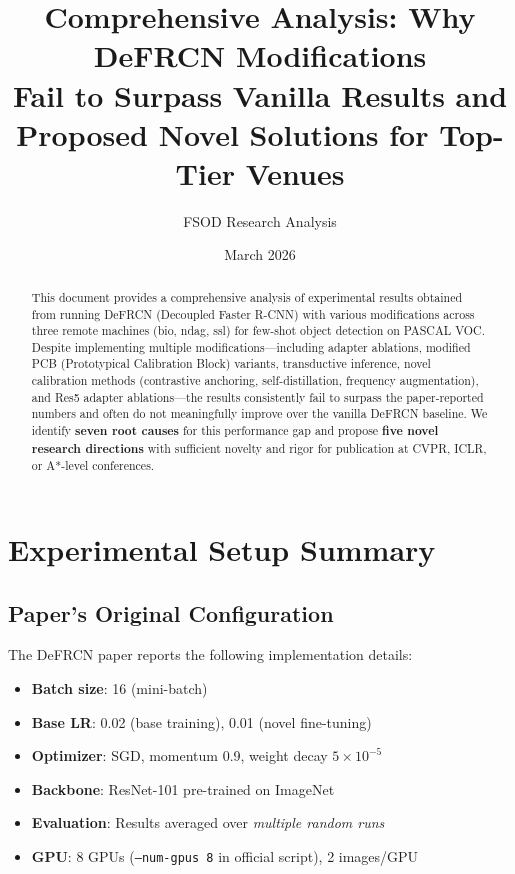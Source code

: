 \documentclass[11pt,a4paper]{article}
\title{\textbf{Comprehensive Analysis: Why DeFRCN Modifications \\
Fail to Surpass Vanilla Results and \\
Proposed Novel Solutions for Top-Tier Venues}}
\author{FSOD Research Analysis}
\date{March 2026}
\begin{document}
\maketitle

\begin{abstract}
This document provides a comprehensive analysis of experimental results obtained from running DeFRCN (Decoupled Faster R-CNN) with various modifications across three remote machines (bio, ndag, ssl) for few-shot object detection on PASCAL VOC. Despite implementing multiple modifications---including adapter ablations, modified PCB (Prototypical Calibration Block) variants, transductive inference, novel calibration methods (contrastive anchoring, self-distillation, frequency augmentation), and Res5 adapter ablations---the results consistently fail to surpass the paper-reported numbers and often do not meaningfully improve over the vanilla DeFRCN baseline. We identify \textbf{seven root causes} for this performance gap and propose \textbf{five novel research directions} with sufficient novelty and rigor for publication at CVPR, ICLR, or A*-level conferences.
\end{abstract}

\tableofcontents
\newpage

\section{Experimental Setup Summary}

\subsection{Paper's Original Configuration}
The DeFRCN paper reports the following implementation details:
\begin{itemize}[nosep]
    \item \textbf{Batch size}: 16 (mini-batch)
    \item \textbf{Base LR}: 0.02 (base training), 0.01 (novel fine-tuning)
    \item \textbf{Optimizer}: SGD, momentum 0.9, weight decay $5 \times 10^{-5}$
    \item \textbf{Backbone}: ResNet-101 pre-trained on ImageNet
    \item \textbf{Evaluation}: Results averaged over \textit{multiple random runs}
    \item \textbf{GPU}: 8 GPUs (\texttt{--num-gpus 8} in official script), 2 images/GPU
\end{itemize}
\end{document}
